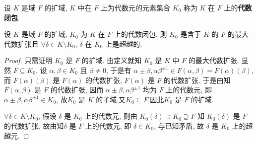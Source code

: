 \documentclass[../../main.tex]{subfiles}%
\begin{document}
\begin{definition}
设 $K$ 是域 $F$ 的扩域, $K$ 中在 $F$ 上为代数元的元素集合 $K_0$ 称为 $K$ 在 $F$ 上的\textbf{代数闭包}.
\end{definition}

\begin{theorem}
设 $K$ 是域 $F$ 的扩域, $K_0$ 为 $K$ 在 $F$ 上的代数闭包, 则 $K_0$ 是含于 $K$ 的 $F$ 的最大代数扩张且 $\forall \delta\in K\setminus K_0$, $\delta$ 在 $K_0$ 上是超越的.
\end{theorem}
\begin{proof}
只需证明 $K_0$ 是 $F$ 的扩域. 由定义就知 $K_0$ 是 $K$ 中 $F$ 的最大代数扩张. 显然 $F\subseteq K_0$. 设 $\alpha,\beta\in K_0$ 且 $\beta\neq 0$, 于是有 $\alpha\pm\beta,\alpha\beta^{\pm 1}\in F(\alpha,\beta)=F(\alpha)(\beta)$, 而 $F(\alpha)(\beta)$ 是 $F(\alpha)$ 的代数扩张, $F(\alpha)$ 是 $F$ 的代数扩张. 于是由知 $F(\alpha,\beta)$ 是 $F$ 的代数扩张, 因而 $\alpha\pm\beta,\alpha\beta^{\pm 1}$ 均为 $F$ 上的代数元, 即 $\alpha\pm\beta,\alpha\beta^{\pm 1}\in K_0$, 故$K_0$ 是 $K$ 的子域.又$K_0\subseteq F$,因此$K_0$ 是 $F$ 的扩域.

$\forall \delta\in K\setminus K_0$, 假设 $\delta$ 是 $K_0$ 上的代数元, 则由 $K_0(\delta)\supset K_0\supseteq F$ 知 $K_0(\delta)$ 是 $F$ 的代数扩张, 故由知$\delta$ 是 $F$ 上的代数元, 即 $\delta\in K_0$, 与已知矛盾, 故 $\delta$ 是 $K_0$ 上的超越元.
\end{proof}
\end{document}
